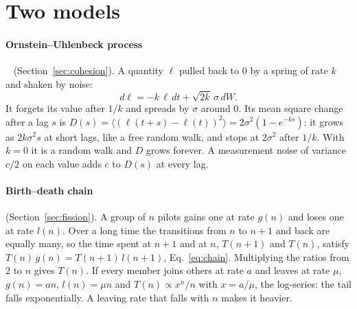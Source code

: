 \section{Two models}\label{app:models}

\paragraph{Ornstein--Uhlenbeck process}~\cite{uhlenbeck1930} (Section~\ref{sec:cohesion}). A quantity
$\ell$ pulled back to 0 by a spring of rate $k$ and shaken by noise:
\begin{equation}
  d\ell=-k\,\ell\,dt+\sqrt{2k}\,\sigma\,dW .
\end{equation}
It forgets its value after $1/k$ and spreads by $\sigma$ around 0. Its mean square change after a
lag $s$ is $D(s)=\langle(\ell(t+s)-\ell(t))^2\rangle=2\sigma^2(1-e^{-ks})$: it grows as
$2k\sigma^2 s$ at short lags, like a free random walk, and stops at $2\sigma^2$ after $1/k$. With
$k=0$ it is a random walk and $D$ grows forever. A measurement noise of variance $c/2$ on each
value adds $c$ to $D(s)$ at every lag.

\paragraph{Birth--death chain} (Section~\ref{sec:fission}). A group of $n$ pilots gains one at rate
$g(n)$ and loses one at rate $l(n)$. Over a long time the transitions from $n$ to $n+1$ and back are
equally many, so the time spent at $n+1$ and at $n$, $T(n+1)$ and $T(n)$, satisfy
$T(n)\,g(n)=T(n+1)\,l(n+1)$, Eq.~\eqref{eq:chain}. Multiplying the ratios from 2 to $n$ gives
$T(n)$. If every member joins others at rate $a$ and leaves at rate $\mu$, $g(n)=an$, $l(n)=\mu n$
and $T(n)\propto x^n/n$ with $x=a/\mu$, the log-series: the tail falls exponentially. A leaving rate
that falls with $n$ makes it heavier.
